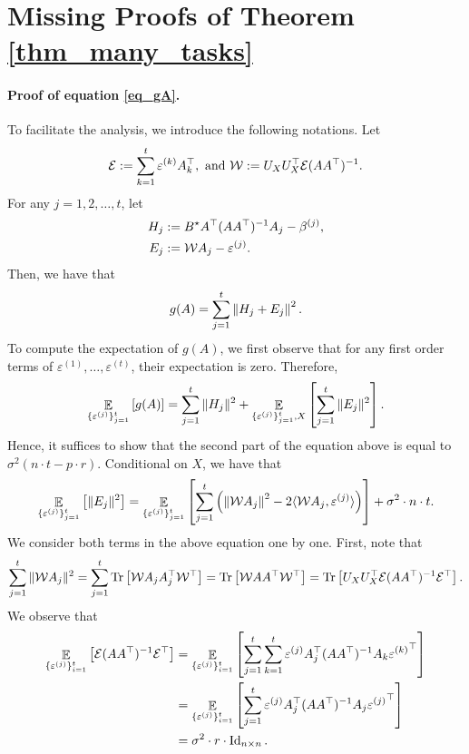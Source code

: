 	\section{Missing Proofs of Theorem \ref{thm_many_tasks}}\label{app_proof_error_same_cov}

	\paragraph{Proof of equation \eqref{eq_gA}.}
	To facilitate the analysis, we introduce the following notations.
	Let
		\[ \mathcal{E} := {\sum_{k=1}^t \varepsilon^{(k)} A_k^{\top}}, \text{ and } {\mathcal W} := U_X U_X^{\top} \mathcal{E} (AA^{\top})^{-1}. \]
	For any $j = 1,2,\dots, t$, let
	\begin{align*}
		H_j &:= B^{\star} A^{\top} (AA^{\top})^{-1} A_j - \beta^{(j)}, \\
		E_j &:= {\mathcal W} A_j - \varepsilon^{(j)}.
	\end{align*}
	Then, we have that
	\[ g(A) = \sum_{j=1}^t \left\| H_j + E_j \right\|^2. \]
	To compute the expectation of $g(A)$, we first observe that for any first order terms of $\varepsilon^{(1)}, \dots, \varepsilon^{(t)}$, their expectation is zero. Therefore,
	\begin{align*}
		\mathop{\mathbb{E}}_{\{\varepsilon^{(j)}\}_{j=1}^t }\left[ g(A) \right] = \sum_{j=1}^t \|H_j\|^2 + \mathop{\mathbb{E}}_{\{\varepsilon^{(j)}\}_{j=1}^t, X}\left[ \sum_{j=1}^t \|E_j\|^2 \right].
	\end{align*}
	Hence, it suffices to show that the second part of the equation above is equal to $\sigma^2 (n\cdot t - p\cdot r)$.
	Conditional on $X$, we have that
	\begin{align*}
		\mathop{\mathbb{E}}_{\{\varepsilon^{(j)}\}_{j=1}^t}\left[ \|E_j\|^2 \right]
		= \mathop{\mathbb{E}}_{\{\varepsilon^{(j)}\}_{j=1}^t}\left[ \sum_{j=1}^t \left({\left\| {\mathcal W} A_j \right\|^2 - 2\langle {\mathcal W} A_j, \varepsilon^{(j)} \rangle }\right) \right] + \sigma^2 \cdot n \cdot t.
	\end{align*}
	We consider both terms in the above equation one by one.
	First, note that
	\begin{align}
		\sum_{j=1}^t \|{\mathcal W} A_j\|^2 = \sum_{j=1}^t \operatorname{Tr}\left[{\mathcal W} A_j A_j^{\top} {\mathcal W}^{\top}\right] = \operatorname{Tr}\left[{\mathcal W} AA^{\top} {\mathcal W}^{\top}\right] = \operatorname{Tr}\left[U_X U_X^{\top} \mathcal{E} (AA^{\top})^{-1} \mathcal{E}^{\top}\right]. \label{eq_proof_same_cov_1}
	\end{align}
	We observe that
	\begin{align*}
			\mathop{\mathbb{E}}_{\{\varepsilon^{(j)}\}_{i=1}^t}\left[ \mathcal{E} (AA^{\top})^{-1} \mathcal{E}^{\top} \right]
		&= \mathop{\mathbb{E}}_{\{\varepsilon^{(j)}\}_{i=1}^t}\left[ \sum_{j=1}^t \sum_{k=1}^t \varepsilon^{(j)} A_j^{\top} (AA^{\top})^{-1} A_k {\varepsilon^{(k)}}^{\top} \right] \\
		&= \mathop{\mathbb{E}}_{\{\varepsilon^{(j)}\}_{i=1}^t}\left[ \sum_{j=1}^t \varepsilon^{(j)} A_j^{\top} (AA^{\top})^{-1} A_j {\varepsilon^{(j)}}^{\top} \right] \\
		&= \sigma^2 \cdot r \cdot \operatorname{Id}_{n\times n}.
	\end{align*}
